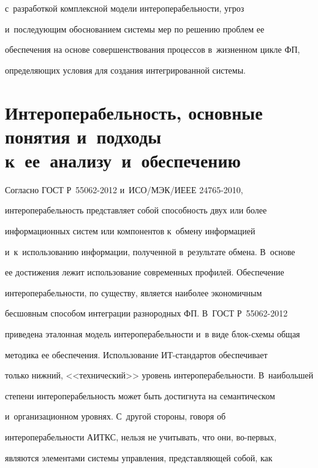 с~разработкой комплексной модели ин\-тер\-опе\-ра\-бель\-ности, угроз 

и~последующим обоснованием системы мер по решению проблем ее 

обеспечения на основе совершенствования процессов в~жизненном цикле ФП, 

определяющих условия для создания интегрированной системы. 



\vspace*{-6pt}

     

\section{Интероперабельность, основные понятия и~подходы к~ее~анализу~и~обеспечению}



\vspace*{-4pt}



  Согласно ГОСТ Р~55062-2012 и~ИСО/МЭК/ИЕЕЕ 24765-2010, 

ин\-тер\-опе\-ра\-бель\-ность представляет собой способность двух или более 

информационных систем или компонентов к~обмену информацией 

и~к~использованию информации, полученной в~результате обмена. В~основе 

ее достижения лежит использование современных профилей. Обеспечение 

интероперабельности, по существу, является наиболее экономичным 

бесшовным способом интеграции разнородных ФП. В~ГОСТ Р~55062-2012 

приведена эталонная модель интероперабельности и~в виде блок-схе\-мы общая 

методика ее обеспечения. Использование ИТ-стан\-дар\-тов обеспечивает 

только нижний, <<технический>> уровень интероперабельности. В~наибольшей 

степени интероперабельность может быть достигнута на семантическом 

и~организационном уровнях. С~другой стороны, говоря об 

ин\-тер\-опе\-ра\-бель\-ности АИТКС, нельзя не учитывать, что они, во-пер\-вых, 

являются элементами системы управления, представляющей собой, как 

